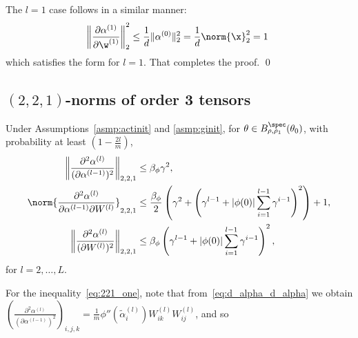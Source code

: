 The $l=1$ case follows in a similar manner:
\begin{equation*}
\left\| \frac{\partial \alpha^{(1)}}{\partial \w^{(1)}} \right\|_2^2 \leq \frac{1}{d}  \| \alpha^{(0)} \|_2^2
=\frac{1}{d}\norm{\x}_2^2=1~%
\end{equation*} 
which satisfies the form for $l=1$. That completes the proof. \qed 


\subsection{$(2,2,1)$-norms of order 3 tensors}

%
\begin{lemm}
\label{lem:221-norm-bound}
Under Assumptions~\ref{asmp:actinit} and \ref{asmp:ginit}, for $\theta \in B_{\rho,\rho_1}^{\spec}(\theta_0)$,  with probability at least $\left(1 - \frac{2l}{m} \right)$,
\begin{align}
\label{eq:221_one}
    \left\|\frac{\partial^2 \alpha^{(l)}}{(\partial \alpha^{(l-1)})^2}\right\|_{2,2,1}
    &\leq\beta_\phi\gamma^2,\\
    \label{eq:221_two}
    \norm{\frac{\partial^2 \alpha^{(l)}}{\partial \alpha^{(l-1)}\partial W^{(l)}}}_{2,2,1}
    &\leq \frac{\beta_\phi}{2}\left(\gamma^2+
\left( \gamma^{l-1} +  | \phi(0)| \sum_{i=1}^{l-1} \gamma^{i-1} \right)^2\right)+1,\\
\label{eq:221_three}
    \left\|\frac{\partial^2 \alpha^{(l)}}{(\partial W^{(l)})^2}\right\|_{2,2,1}
    &\leq \beta_\phi
\left( \gamma^{l-1} +  | \phi(0)| \sum_{i=1}^{l-1} \gamma^{i-1} \right)^2,
\end{align}
for $l=2,\dots,L$.
\end{lemm}
\proof
%
For the inequality~\eqref{eq:221_one}, note that from~\eqref{eq:d_alpha_d_alpha} we obtain
$
\left(\frac{\partial^2 \alpha^{(l)}}{(\partial \alpha^{(l-1)})^2}\right)_{i,j,k}=\frac{1}{m}\phi''(\tilde{\alpha}_i^{(l)})W^{(l)}_{ik}W^{(l)}_{ij}
$, and so
